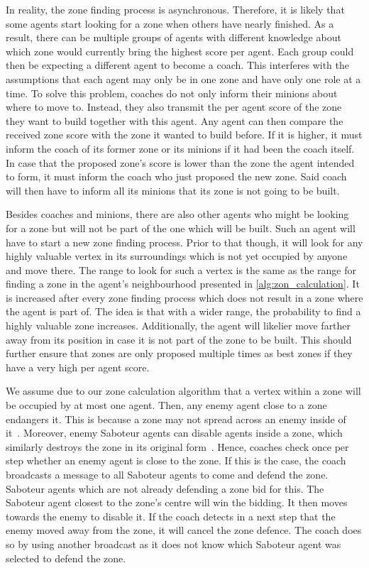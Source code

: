 In reality, the zone finding process is asynchronous.
Therefore, it is likely that some agents start looking for a zone when others have nearly finished.
As a result, there can be multiple groups of agents with different knowledge about which zone would currently bring the highest score per agent.
Each group could then be expecting a different agent to become a coach.
This interferes with the assumptions that each agent may only be in one zone and have only one role at a time.
To solve this problem, coaches do not only inform their minions about where to move to.
Instead, they also transmit the per agent score of the zone they want to build together with this agent.
Any agent can then compare the received zone score with the zone it wanted to build before.
If it is higher, it must inform the coach of its former zone or its minions if it had been the coach itself.
In case that the proposed zone's score is lower than the zone the agent intended to form, it must inform the coach who just proposed the new zone.
Said coach will then have to inform all its minions that its zone is not going to be built.

Besides coaches and minions, there are also other agents who might be looking for a zone but will not be part of the one which will be built.
Such an agent will have to start a new zone finding process.
Prior to that though, it will look for any highly valuable vertex in its surroundings which is not yet occupied by anyone and move there.
The range to look for such a vertex is the same as the range for finding a zone in the agent's neighbourhood presented in \autoref{alg:zon_calculation}.
It is increased after every zone finding process which does not result in a zone where the agent is part of.
The idea is that with a wider range, the probability to find a highly valuable zone increases.
Additionally, the agent will likelier move farther away from its position in case it is not part of the zone to be built.
This should further ensure that zones are only proposed multiple times as best zones if they have a very high per agent score.

We assume due to our zone calculation algorithm that a vertex within a zone will be occupied by at most one agent.
Then, any enemy agent close to a zone endangers it.
This is because a zone may not spread across an enemy inside of it~\cite{ahlbrecht_mapc_2014}.  %
Moreover, enemy Saboteur agents can disable agents inside a zone, which similarly destroys the zone in its original form~\cite{ahlbrecht_mapc_2014}.  %
Hence, coaches check once per step whether an enemy agent is close to the zone.
If this is the case, the coach broadcasts a message to all Saboteur agents to come and defend the zone.
Saboteur agents which are not already defending a zone bid for this.
The Saboteur agent closest to the zone's centre will win the bidding.
It then moves towards the enemy to disable it.
If the coach detects in a next step that the enemy moved away from the zone, it will cancel the zone defence.
The coach does so by using another broadcast as it does not know which Saboteur agent was selected to defend the zone.

